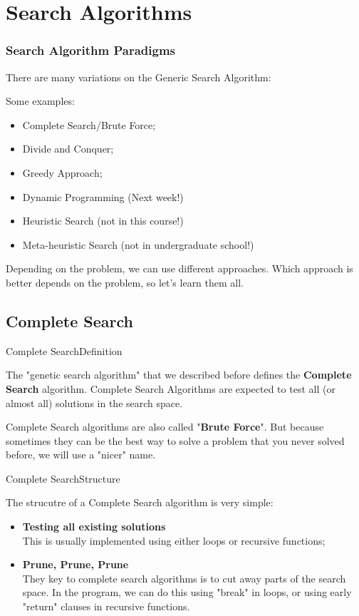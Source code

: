 \section{Search Algorithms}
\begin{frame}
  \frametitle{Search Algorithm Paradigms}
  There are many variations on the Generic Search Algorithm:
  \bigskip

  Some examples:
  \begin{itemize}
    \item Complete Search/Brute Force;
    \item Divide and Conquer;
    \item Greedy Approach;
    \item Dynamic Programming (Next week!)
    \item Heuristic Search (not in this course!)
    \item Meta-heuristic Search (not in undergraduate school!)
  \end{itemize}
  \bigskip

  Depending on the problem, we can use different approaches. Which approach is better depends on the problem, so let's learn them all.
\end{frame}


\subsection{Complete Search}

\begin{frame}{Complete Search}{Definition}

  The "genetic search algorithm" that we described before defines the {\bf Complete Search} algorithm. Complete Search Algorithms are expected to test all (or almost all) solutions in the search space.\bigskip

  Complete Search algorithms are also called "{\bf Brute Force}". But because sometimes they can be the best way to solve a problem that you never solved before, we will use a "nicer" name.
\end{frame}


\begin{frame}{Complete Search}{Structure}

  The strucutre of a Complete Search algorithm is very simple:
  \bigskip

  \begin{itemize}
  \item {\bf Testing all existing solutions}\\
    This is usually implemented using either loops or recursive functions;
    \bigskip

  \item {\bf Prune, Prune, Prune}\\
    They key to complete search algorithms is to cut away parts of the search space. In the program, we can do this using "break" in loops, or using early "return" clauses in recursive functions.
  \end{itemize}

\end{frame}


